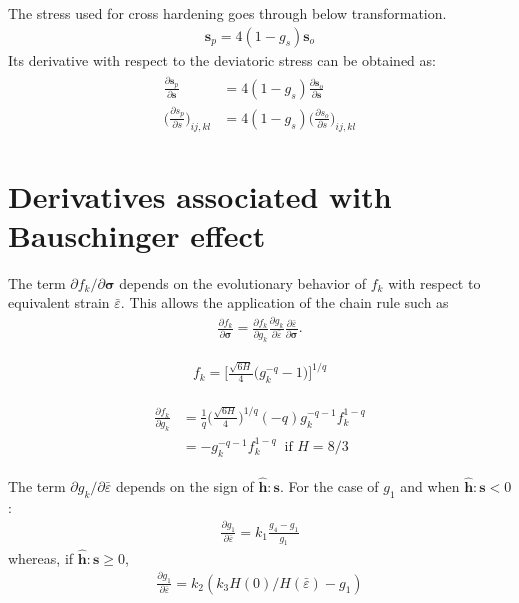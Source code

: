 \documentclass[12pt]{amsart}
\begin{document}
The stress used for cross hardening goes through below transformation.
\begin{eqnarray}
  \label{eq:cross_linear1}
  \mathbf{s}_p = 4(1-g_s)\mathbf{s}_o
\end{eqnarray}
Its derivative with respect to the deviatoric stress can be obtained as:
\begin{eqnarray}
  \begin{split}
    \label{eq:cross_linear2}
    \frac{\partial\mathbf{s}_p}{\partial\mathbf{s}}                 &= 4(1-g_s) \frac{\partial\mathbf{s}_o}{\partial\mathbf{s}} \\
    \bigg(\frac{\partial s_p}{\partial s} \bigg)_{ij,kl} &=  4(1-g_s) \bigg(\frac{\partial s_o}{\partial s}\bigg)_{ij,kl}
  \end{split}
\end{eqnarray}


\newpage
\section{Derivatives associated with Bauschinger effect}
\label{sec:bauschinger}


The term $\partial f_k/\partial\mathbf{\sigma}$ depends on the evolutionary behavior of $f_k$ with respect to equivalent strain $\bar{\varepsilon}$.
This allows the application of the chain rule such as
\begin{eqnarray}
  \label{eq:dphib7}
  \frac{\partial f_k}{\partial\mathbf{\sigma}}=\frac{\partial f_k}{\partial g_k} \frac{\partial g_k}{\partial \bar{\varepsilon}}  \frac{\partial{\bar{\varepsilon}}}{\partial\mathbf{\sigma}}.
\end{eqnarray}

\begin{eqnarray}
  \label{eq:fk1}
  f_k = \bigg[ \frac{\sqrt{6H}}{4}   \Big(  g_k^{-q} - 1  \Big)  \bigg] ^{1/q}
\end{eqnarray}


\begin{eqnarray}
  \label{eq:fk2}
  \begin{split}
  \frac{\partial f_k}{\partial{g_k}} &= \frac{1}{q}   \bigg(\frac{\sqrt{6H}}{4} \bigg)^{1/q}  (-q) g_k^{-q-1}    f_k^{1-q}\\
  &=-g_k^{-q-1} f_k^{1-q}  \ \text{  if } H=8/3
  \end{split}
\end{eqnarray}

The term $  \partial{g_k}/\partial{\bar{\varepsilon}} $ depends on the sign of $\hat{\mathbf{h}}:\mathbf{s}$.
For the case of $g_1$ and when  $\hat{\mathbf{h}}:\mathbf{s}<0$:
\begin{eqnarray}
  \label{eq:dbau2}
\frac{\partial{g_1}}{\partial{\bar{\varepsilon}}}=k_1 \frac{g_4-g_1}{g_1}
\end{eqnarray}
whereas, if $\hat{\mathbf{h}}:\mathbf{s}\ge0$,
\begin{eqnarray}
  \label{eq:dbau3}
\frac{\partial{g_1}}{\partial{\bar{\varepsilon}}}=k_2 (k_3 H(0)/H(\bar{\varepsilon})-g_1)
\end{eqnarray}
\end{document}
